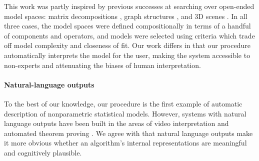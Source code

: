 \documentclass[letterpaper]{article}
\def\eg{e.g.\ }
\newcommand{\procedurename}{ABCD}
\begin{document}
This work was partly inspired by previous successes at searching over open-ended model spaces: matrix decompositions \citep{grosse2012exploiting}, graph structures \citep{kemp2008discovery}, and 3D scenes \cite{VikashScene13}.
In all three cases, the model spaces were defined compositionally in terms of a handful of components and operators, and models were selected using criteria which trade off model complexity and closeness of fit.
Our work differs in that our procedure automatically interprets the model for the user, making the system accessible to non-experts and attenuating the biases of human interpretation.




\paragraph{Natural-language outputs}
To the best of our knowledge, our procedure is the first example of automatic description of nonparametric statistical models.
However, systems with natural language outputs have been built in the areas of video interpretation \citep{barbu2012video} and automated theorem proving \citep{GanesalingamG13}.
We agree with \citet{GanesalingamG13} that natural language outputs make it more obvious whether an algorithm's internal representations are meaningful and cognitively plausible.
\end{document}
